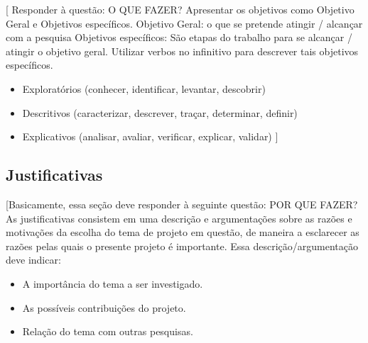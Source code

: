 [ Responder à questão: O QUE FAZER?
Apresentar os objetivos como Objetivo Geral e Objetivos específicos.
Objetivo Geral: o que se pretende atingir / alcançar com a pesquisa
Objetivos específicos: São etapas do trabalho para se alcançar / atingir o objetivo geral. Utilizar verbos no infinitivo para descrever tais objetivos específicos.
\begin{itemize}
	\item Exploratórios (conhecer, identificar, levantar, descobrir)
	\item Descritivos (caracterizar, descrever, traçar, determinar, definir)
	\item Explicativos (analisar, avaliar, verificar, explicar, validar)   ]
\end{itemize}


\subsection{Justificativas} %
\label{sub:justificativas}

[Basicamente, essa seção deve responder à seguinte questão: POR QUE FAZER?
As justificativas consistem em uma descrição e argumentações sobre as razões e motivações da escolha do tema de projeto em questão, de maneira a esclarecer as razões pelas quais o presente projeto é importante.
Essa descrição/argumentação deve indicar:
\begin{itemize}
	\item A importância do tema a ser investigado.
	\item As possíveis contribuições do projeto.
	\item Relação do tema com outras pesquisas.
\end{itemize}
